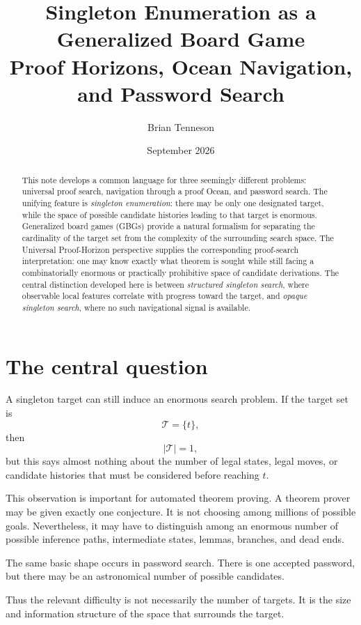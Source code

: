 \documentclass[11pt]{article}
\title{\textbf{Singleton Enumeration as a Generalized Board Game}\\
\large Proof Horizons, Ocean Navigation, and Password Search}
\author{Brian Tenneson}
\date{September 2026}
\newcommand{\Tset}{\mathcal{T}}
\begin{document}
\maketitle

\begin{abstract}
This note develops a common language for three seemingly different problems:
universal proof search, navigation through a proof Ocean, and password search.
The unifying feature is \emph{singleton enumeration}: there may be only one
designated target, while the space of possible candidate histories leading to
that target is enormous. Generalized board games (GBGs) provide a natural
formalism for separating the cardinality of the target set from the complexity
of the surrounding search space. The Universal Proof-Horizon perspective
supplies the corresponding proof-search interpretation: one may know exactly
what theorem is sought while still facing a combinatorially enormous or practically prohibitive space of
candidate derivations. The central distinction developed here is between
\emph{structured singleton search}, where observable local features correlate
with progress toward the target, and \emph{opaque singleton search}, where no
such navigational signal is available.
\end{abstract}

\section{The central question}

A singleton target can still induce an enormous search problem. If the target
set is
\[
\Tset=\{t\},
\]
then
\[
|\Tset|=1,
\]
but this says almost nothing about the number of legal states, legal moves, or
candidate histories that must be considered before reaching \(t\).

This observation is important for automated theorem proving. A theorem prover
may be given exactly one conjecture. It is not choosing among millions of
possible goals. Nevertheless, it may have to distinguish among an enormous
number of possible inference paths, intermediate states, lemmas, branches, and
dead ends.

The same basic shape occurs in password search. There is one accepted
password, but there may be an astronomical number of possible candidates.

Thus the relevant difficulty is not necessarily the number of targets. It is
the size and information structure of the space that surrounds the target.
\end{document}
